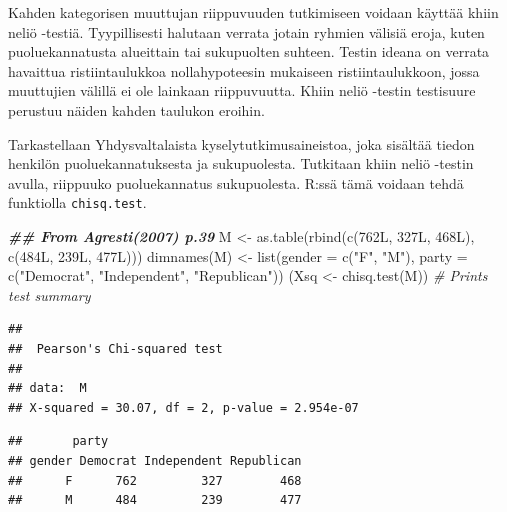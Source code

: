 \documentclass[
]{book}
\newenvironment{Shaded}{\begin{snugshade}}{\end{snugshade}}
\newcommand{\AttributeTok}[1]{\textcolor[rgb]{0.77,0.63,0.00}{#1}}
\newcommand{\CommentTok}[1]{\textcolor[rgb]{0.56,0.35,0.01}{\textit{#1}}}
\newcommand{\DocumentationTok}[1]{\textcolor[rgb]{0.56,0.35,0.01}{\textbf{\textit{#1}}}}
\newcommand{\FunctionTok}[1]{\textcolor[rgb]{0.00,0.00,0.00}{#1}}
\newcommand{\NormalTok}[1]{#1}
\newcommand{\OtherTok}[1]{\textcolor[rgb]{0.56,0.35,0.01}{#1}}
\newcommand{\SpecialCharTok}[1]{\textcolor[rgb]{0.00,0.00,0.00}{#1}}
\newcommand{\StringTok}[1]{\textcolor[rgb]{0.31,0.60,0.02}{#1}}
\begin{document}
Kahden kategorisen muuttujan riippuvuuden tutkimiseen voidaan käyttää khiin neliö -testiä. Tyypillisesti halutaan verrata jotain ryhmien välisiä eroja, kuten puoluekannatusta alueittain tai sukupuolten suhteen. Testin ideana on verrata havaittua ristiintaulukkoa nollahypoteesin mukaiseen ristiintaulukkoon, jossa muuttujien välillä ei ole lainkaan riippuvuutta. Khiin neliö -testin testisuure perustuu näiden kahden taulukon eroihin.

Tarkastellaan Yhdysvaltalaista kyselytutkimusaineistoa, joka sisältää tiedon henkilön puoluekannatuksesta ja sukupuolesta. Tutkitaan khiin neliö -testin avulla, riippuuko puoluekannatus sukupuolesta. R:ssä tämä voidaan tehdä funktiolla \texttt{chisq.test}.

\begin{Shaded}
\begin{Highlighting}[]
\DocumentationTok{\#\# From Agresti(2007) p.39}
\NormalTok{M }\OtherTok{\textless{}{-}} \FunctionTok{as.table}\NormalTok{(}\FunctionTok{rbind}\NormalTok{(}\FunctionTok{c}\NormalTok{(762L, 327L, 468L), }\FunctionTok{c}\NormalTok{(484L, 239L, 477L)))}
\FunctionTok{dimnames}\NormalTok{(M) }\OtherTok{\textless{}{-}} \FunctionTok{list}\NormalTok{(}\AttributeTok{gender =} \FunctionTok{c}\NormalTok{(}\StringTok{"F"}\NormalTok{, }\StringTok{"M"}\NormalTok{),}
                    \AttributeTok{party =} \FunctionTok{c}\NormalTok{(}\StringTok{"Democrat"}\NormalTok{, }\StringTok{"Independent"}\NormalTok{, }\StringTok{"Republican"}\NormalTok{))}
\NormalTok{(Xsq }\OtherTok{\textless{}{-}} \FunctionTok{chisq.test}\NormalTok{(M))  }\CommentTok{\# Prints test summary}
\end{Highlighting}
\end{Shaded}

\begin{verbatim}
## 
##  Pearson's Chi-squared test
## 
## data:  M
## X-squared = 30.07, df = 2, p-value = 2.954e-07
\end{verbatim}

\begin{Shaded}
\end{Shaded}

\begin{verbatim}
##       party
## gender Democrat Independent Republican
##      F      762         327        468
##      M      484         239        477
\end{verbatim}
\end{document}
